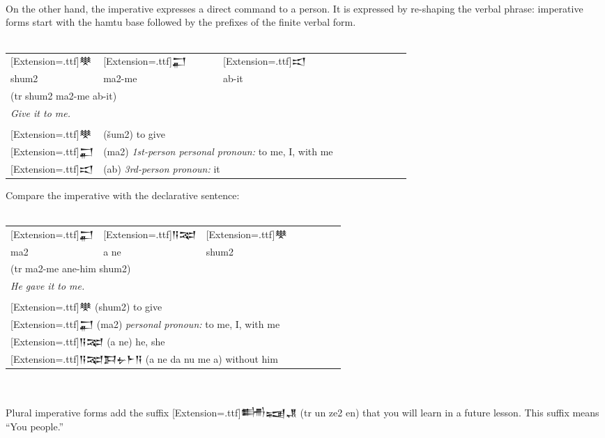\documentclass[a4paper,12pt]{book}
\newcommand{\fcn}{\setmainfont{Akkadian}[Extension=.ttf]}
\newcommand{\fcm}{\large\setmainfont{Akkadian}[Extension=.ttf]}
\newcommand{\fsm}{\Large\setmainfont{Akkadian}[Extension=.ttf]}
\begin{document}
\verb||\\
On the other hand, the imperative expresses
a direct command to a person. It is expressed
by re-shaping the verbal phrase: imperative
forms start with the hamtu base followed by
the prefixes of the finite verbal form.\\

\verb||\\
\begin{tabular}[!h]{l l l l l l l l l l}
  \fsm  𒋧 &\fsm 𒂷&\fsm 𒀊\\
  shum2    & ma2-me & ab-it\\
  \multicolumn{3}{l}{(tr shum2 ma2-me ab-it)}\\
  \multicolumn{3}{l}{\em Give it to me.}\\
  \hline\\
  \fsm 𒋧  &\multicolumn{2}{l}{(šum2) to give}\\
  \fsm 𒂷
  &\multicolumn{2}{l}{(ma2)
    {\em 1st-person personal pronoun:}
    to me, I, with me}\\
  \fsm 𒀊  &\multicolumn{2}{l}{(ab) {\em 3rd-person pronoun:} it}\\
\end{tabular}
\index{ma2-me {\fcn 𒂷}  ! to me, I, with me}

\newpage
\noindent
Compare the imperative with the declarative sentence:\\

\verb||\\
\begin{tabular}[!h]{l l l l l l l l}
  \fsm 𒂷 &\fsm 𒀀𒉈 &\fsm 𒋧\\
  ma2 & a ne & shum2\\
  \multicolumn{3}{l}{(tr ma2-me ane-him shum2)}\\
  \multicolumn{3}{l}{\em He gave it to me.}\\
  \hline\\
  \multicolumn{3}{l}{{\fcm 𒋧} (shum2) to give }\\
  \multicolumn{3}{l}{{\fcm 𒂷} (ma2)
    {\em personal pronoun:} to me, I, with me }\\
  \multicolumn{3}{l}{{\fcm 𒀀𒉈} (a ne) he, she }\\
  \multicolumn{3}{l}{{\fcm 𒀀𒉈𒁕𒉡𒈨𒀀} (a ne da nu me a) without him }\\
\end{tabular}\verb||\\

\verb||\\
Plural imperative forms add the
suffix {\fcn 𒌦𒍢𒂗} (tr un ze2 en) that
you will learn in a future lesson. This suffix
means ``You people.''\\
\end{document}
